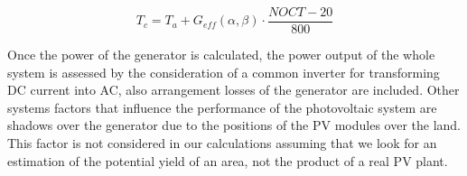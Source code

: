\begin{equation}\label{Tcelula}
T_c=T_a + G_{eff}(\alpha, \beta) \cdot \frac{NOCT-20}{800}
\label{eq:Tc}
\end{equation}


Once the power of the generator is calculated, the power output of the whole system is assessed by the consideration of a common inverter for transforming DC current into AC, also arrangement losses of the generator are included. Other systems factors that influence the performance of the photovoltaic system are shadows over the generator due to the positions of the PV modules over the land. This factor is not considered in our calculations assuming that we look for an estimation of the potential yield of an area, not the product of a real PV plant. %

